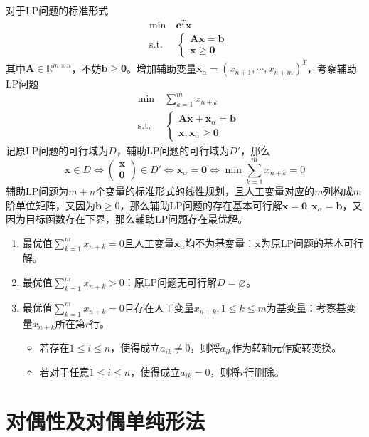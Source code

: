 \documentclass[lang = cn, scheme = chinese, thmcnt = section]{elegantbook}
\newcommand{\R}{\mathbb{R}}            %
\newcommand{\bs}{\boldsymbol}          %
\begin{document}
对于LP问题的标准形式
\begin{align*}
	& \text{min}  \quad \bs{c}^T\bs{x}\\
	& \text{s.t.} \;\, \quad \begin{cases}
		\bs{A} \bs{x} = \bs{b}\\
		\bs{x} \ge \bs{0}
	\end{cases}
\end{align*}
其中$\bs{A}\in\R^{m\times n}$，不妨$\bs{b}\ge \bs{0}$。增加辅助变量$\bs{x}_\alpha=(x_{n+1},\cdots,x_{n+m})^T$，考察辅助LP问题
\begin{align*}
	& \text{min}  \quad \sum_{k=1}^{m}x_{n+k}\\
	& \text{s.t.} \;\, \quad \begin{cases}
		\bs{A} \bs{x} + \bs{x}_\alpha = \bs{b}\\
		\bs{x},\bs{x}_\alpha  \ge \bs{0}
	\end{cases}
\end{align*}
记原LP问题的可行域为$D$，辅助LP问题的可行域为$D'$，那么
$$
\bs{x}\in D
\iff 
\begin{pmatrix}
	\bs{x}\\\bs{0}
\end{pmatrix}\in D'
\iff 
\bs{x}_\alpha=\bs{0}
\iff 
\min \sum_{k=1}^{m}x_{n+k}=0
$$
辅助LP问题为$m+n$个变量的标准形式的线性规划，且人工变量对应的$m$列构成$m$阶单位矩阵，又因为$\bs{b}\ge 0$，那么辅助LP问题的存在基本可行解$\bs{x}=\bs{0},\bs{x}_\alpha=\bs{b}$，又因为目标函数存在下界，那么辅助LP问题存在最优解。
\begin{enumerate}
	\item 最优值$\displaystyle \sum_{k=1}^{m}x_{n+k}=0$且人工变量$\bs{x}_\alpha$均不为基变量：$\overline{\bs{x}}$为原LP问题的基本可行解。
	\item 最优值$\displaystyle \sum_{k=1}^{m}x_{n+k}>0$：原LP问题无可行解$D=\varnothing$。
	\item 最优值$\displaystyle \sum_{k=1}^{m}x_{n+k}=0$且存在人工变量$x_{n+k},1\le k\le m$为基变量：考察基变量$x_{n+k}$所在第$r$行。
	\begin{itemize}
		\item 若存在$1\le i \le n$，使得成立$a_{ik}\ne 0$，则将$a_{ik}$作为转轴元作旋转变换。
		\item 若对于任意$1\le i \le n$，使得成立$a_{ik}= 0$，则将$r$行删除。
	\end{itemize}
\end{enumerate}

\section{对偶性及对偶单纯形法}
\end{document}

